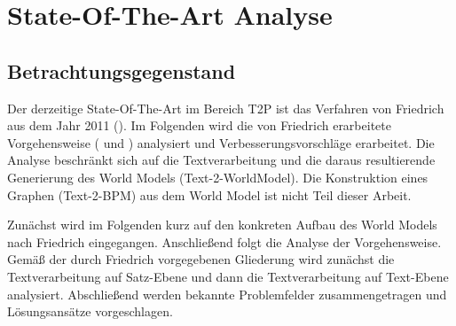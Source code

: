 \section{State-Of-The-Art Analyse}

\subsection{Betrachtungsgegenstand}
Der derzeitige State-Of-The-Art im Bereich \ac{T2P} ist das Verfahren von Friedrich aus dem Jahr 2011 (\cite[vgl.][11]{RIEFER}). Im Folgenden wird die von Friedrich erarbeitete Vorgehensweise (\cite[vgl.][]{FRIEDRICH1} und \cite[vgl.][]{FRIEDRICH2}) analysiert und Verbesserungsvorschläge erarbeitet. Die Analyse beschränkt sich auf die Textverarbeitung und die daraus resultierende Generierung des World Models (Text-2-WorldModel). Die Konstruktion eines Graphen (Text-2-BPM) aus dem World Model ist nicht Teil dieser Arbeit.
\par
Zunächst wird im Folgenden kurz auf den konkreten Aufbau des World Models nach Friedrich eingegangen. Anschließend folgt die Analyse der Vorgehensweise. Gemäß der durch Friedrich vorgegebenen Gliederung wird zunächst die Textverarbeitung auf Satz-Ebene und dann die Textverarbeitung auf Text-Ebene analysiert. Abschließend werden bekannte Problemfelder zusammengetragen und Lösungsansätze vorgeschlagen.

